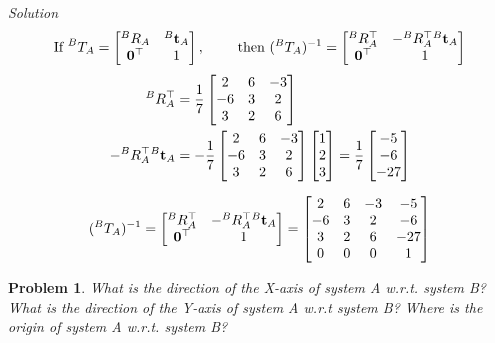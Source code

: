 \documentclass{article}
\newtheorem{prob}{Problem}
\numberwithin{prob}{section}
\newenvironment{solution}{\emph{Solution}}{}
\begin{document}
\begin{solution}
\begin{align}
  \text{If }
  ^BT_A = \begin{bmatrix}
    ^BR_A & ^B\mathbf{t}_A \\ 
    \mathbf{0}^\top & 1
  \end{bmatrix},
  \qquad \text{ then }
  ({}^BT_A)^{-1} = \begin{bmatrix}
    {}^BR^\top_A & - {}^BR^\top_A {}^B\mathbf{t}_A \\ 
    \mathbf{0}^\top & 1
  \end{bmatrix}
\end{align}
\begin{align}
  {}^BR^\top_A &= \frac{1}{7}\begin{bmatrix}
    2 & 6 & -3 \\
    -6 & 3 & 2 \\
    3 & 2 & 6
  \end{bmatrix}\\
    - {}^BR^\top_A {}^B\mathbf{t}_A &=  - \frac{1}{7}\begin{bmatrix}
    2 & 6 & -3 \\
    -6 & 3 & 2 \\
    3 & 2 & 6
    \end{bmatrix} \begin{bmatrix} 1 \\ 2 \\ 3 \end{bmatrix}
    = \frac{1}{7}\begin{bmatrix} -5 \\ -6 \\ -27 \end{bmatrix}
\end{align}

\begin{align}
  ({}^BT_A)^{-1} = \begin{bmatrix}
    {}^BR^\top_A & - {}^BR^\top_A {}^B\mathbf{t}_A \\ 
    \mathbf{0}^\top & 1
  \end{bmatrix}
  = \begin{bmatrix}
    2 & 6 & -3 & -5\\
    -6 & 3 & 2 & -6\\
    3 & 2 & 6 & -27 \\
    0 & 0 & 0 & 1
  \end{bmatrix}
\end{align}

\end{solution}
\begin{prob}
What is the direction of the X-axis of system A w.r.t. system B? What is the direction of the Y-axis of system A w.r.t system B? Where is the origin of system A w.r.t. system B?
\end{prob}
\end{document}
